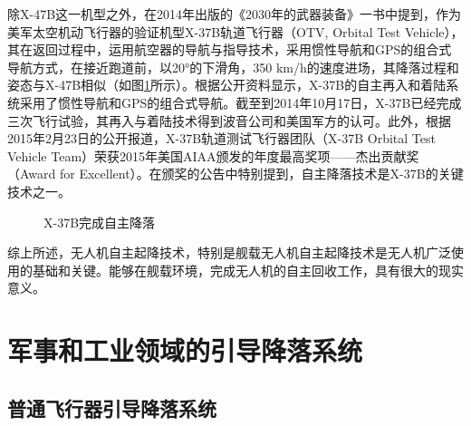 除X-47B这一机型之外，在2014年出版的《2030年的武器装备》\cite{2030equipment}一书中提到，作为美军太空机动飞行器的验证机型X-37B轨道飞行器（OTV, Orbital Test Vehicle），其在返回过程中，运用航空器的导航与指导技术，采用惯性导航和GPS的组合式导航方式，在接近跑道前，以20°的下滑角，350 km/h的速度进场，其降落过程和姿态与X-47B相似（如图\ref{fig:31_X37B_Landing}所示）。根据公开资料显示，X-37B的自主再入和着陆系统采用了惯性导航和GPS的组合式导航。截至到2014年10月17日，X-37B已经完成三次飞行试验，其再入与着陆技术得到波音公司和美国军方的认可。此外，根据2015年2月23日的公开报道，X-37B轨道测试飞行器团队（X-37B Orbital Test Vehicle Team）荣获2015年美国AIAA颁发的年度最高奖项——杰出贡献奖（Award for Excellent）\cite{X_37B}。在颁奖的公告中特别提到，自主降落技术是X-37B的关键技术之一。

\begin{figure}[htb]
	\centering%
	\hspace{0.7em}%
	\caption{X-37B完成自主降落}
	\label{fig:31_X37B_Landing}
\end{figure}

综上所述，无人机自主起降技术，特别是舰载无人机自主起降技术是无人机广泛使用的基础和关键。能够在舰载环境，完成无人机的自主回收工作，具有很大的现实意义。


\section{军事和工业领域的引导降落系统}
\subsection{普通飞行器引导降落系统}
